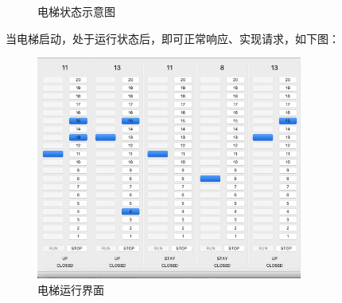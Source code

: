 \documentclass{article}
\begin{document}
\begin{CJK}{UTF8}{gbsn}
 \begin{figure}[H]  
 \centering
  \hspace{0.5in}
   
  \caption{电梯状态示意图}
  \label{fig:subfig} %
 \end{figure}

当电梯启动，处于运行状态后，即可正常响应、实现请求，如下图：

\begin{figure}[!h]
\centering
\includegraphics[width=0.78\textwidth]{6.png}
\caption{电梯运行界面}
\end{figure}


\end{CJK}
\end{document}
